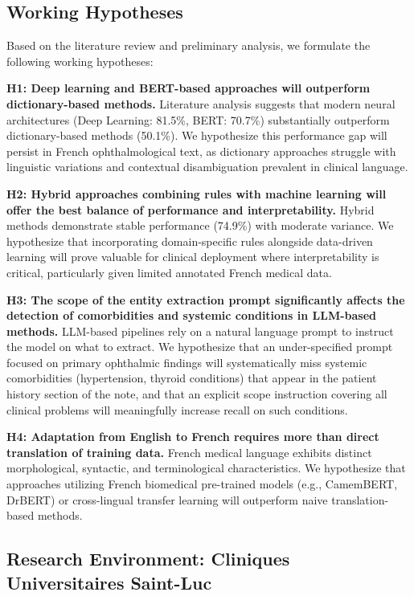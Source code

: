 \subsection{Working Hypotheses}

Based on the literature review and preliminary analysis, we formulate the following working hypotheses:

\textbf{H1: Deep learning and BERT-based approaches will outperform dictionary-based methods.}
Literature analysis suggests that modern neural architectures (Deep Learning: 81.5\%, BERT: 70.7\%) substantially outperform dictionary-based methods (50.1\%). We hypothesize this performance gap will persist in French ophthalmological text, as dictionary approaches struggle with linguistic variations and contextual disambiguation prevalent in clinical language.

\textbf{H2: Hybrid approaches combining rules with machine learning will offer the best balance of performance and interpretability.}
Hybrid methods demonstrate stable performance (74.9\%) with moderate variance. We hypothesize that incorporating domain-specific rules alongside data-driven learning will prove valuable for clinical deployment where interpretability is critical, particularly given limited annotated French medical data.

\textbf{H3: The scope of the entity extraction prompt significantly affects the detection of comorbidities and systemic conditions in LLM-based methods.}
LLM-based pipelines rely on a natural language prompt to instruct the model on what to extract. We hypothesize that an under-specified prompt focused on primary ophthalmic findings will systematically miss systemic comorbidities (hypertension, thyroid conditions) that appear in the patient history section of the note, and that an explicit scope instruction covering all clinical problems will meaningfully increase recall on such conditions.

\textbf{H4: Adaptation from English to French requires more than direct translation of training data.}
French medical language exhibits distinct morphological, syntactic, and terminological characteristics. We hypothesize that approaches utilizing French biomedical pre-trained models (e.g., CamemBERT, DrBERT) or cross-lingual transfer learning will outperform naive translation-based methods.

\subsection{Research Environment: Cliniques Universitaires Saint-Luc}

